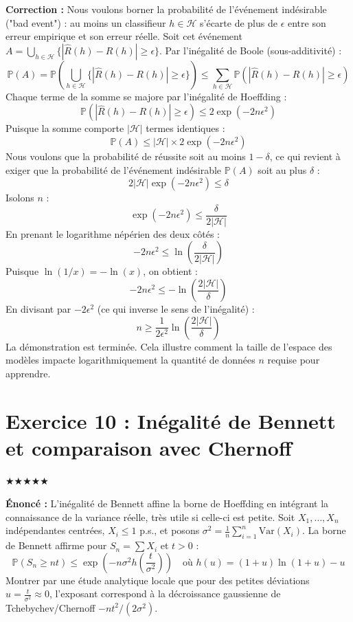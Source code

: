 \documentclass[11pt,a4paper]{article}
\begin{document}
\textbf{Correction :}
Nous voulons borner la probabilité de l'événement indésirable ("bad event") : au moins un classifieur $h \in \mathcal{H}$ s'écarte de plus de $\epsilon$ entre son erreur empirique et son erreur réelle.
Soit cet événement $A = \bigcup_{h \in \mathcal{H}} \{ |\hat{R}(h) - R(h)| \ge \epsilon \}$.
Par l'inégalité de Boole (sous-additivité) :
$$ \mathbb{P}(A) = \mathbb{P}\left( \bigcup_{h \in \mathcal{H}} \{ |\hat{R}(h) - R(h)| \ge \epsilon \} \right) \le \sum_{h \in \mathcal{H}} \mathbb{P}(|\hat{R}(h) - R(h)| \ge \epsilon) $$
Chaque terme de la somme se majore par l'inégalité de Hoeffding :
$$ \mathbb{P}(|\hat{R}(h) - R(h)| \ge \epsilon) \le 2\exp(-2n\epsilon^2) $$
Puisque la somme comporte $|\mathcal{H}|$ termes identiques :
$$ \mathbb{P}(A) \le |\mathcal{H}| \times 2\exp(-2n\epsilon^2) $$
Nous voulons que la probabilité de réussite soit au moins $1 - \delta$, ce qui revient à exiger que la probabilité de l'événement indésirable $\mathbb{P}(A)$ soit au plus $\delta$ :
$$ 2 |\mathcal{H}| \exp(-2n\epsilon^2) \le \delta $$
Isolons $n$ :
$$ \exp(-2n\epsilon^2) \le \frac{\delta}{2|\mathcal{H}|} $$
En prenant le logarithme népérien des deux côtés :
$$ -2n\epsilon^2 \le \ln\left( \frac{\delta}{2|\mathcal{H}|} \right) $$
Puisque $\ln(1/x) = -\ln(x)$, on obtient :
$$ -2n\epsilon^2 \le -\ln\left( \frac{2|\mathcal{H}|}{\delta} \right) $$
En divisant par $-2\epsilon^2$ (ce qui inverse le sens de l'inégalité) :
$$ n \ge \frac{1}{2\epsilon^2} \ln\left(\frac{2|\mathcal{H}|}{\delta}\right) $$
La démonstration est terminée. Cela illustre comment la taille de l'espace des modèles impacte logarithmiquement la quantité de données $n$ requise pour apprendre.


\section*{Exercice 10 : Inégalité de Bennett et comparaison avec Chernoff}

$\bigstar\bigstar\bigstar\bigstar\bigstar$

\textbf{Énoncé :}
L'inégalité de Bennett affine la borne de Hoeffding en intégrant la connaissance de la variance réelle, très utile si celle-ci est petite.
Soit $X_1, \dots, X_n$ indépendantes centrées, $X_i \le 1$ p.s., et posons $\sigma^2 = \frac{1}{n} \sum_{i=1}^n \text{Var}(X_i)$.
La borne de Bennett affirme pour $S_n = \sum X_i$ et $t > 0$ :
$$ \mathbb{P}(S_n \ge nt) \le \exp\left( -n \sigma^2 h\left(\frac{t}{\sigma^2}\right) \right) \quad \text{où } h(u) = (1+u)\ln(1+u) - u $$
Montrer par une étude analytique locale que pour des petites déviations $u = \frac{t}{\sigma^2} \approx 0$, l'exposant correspond à la décroissance gaussienne de Tchebychev/Chernoff $-nt^2/(2\sigma^2)$.
\end{document}
